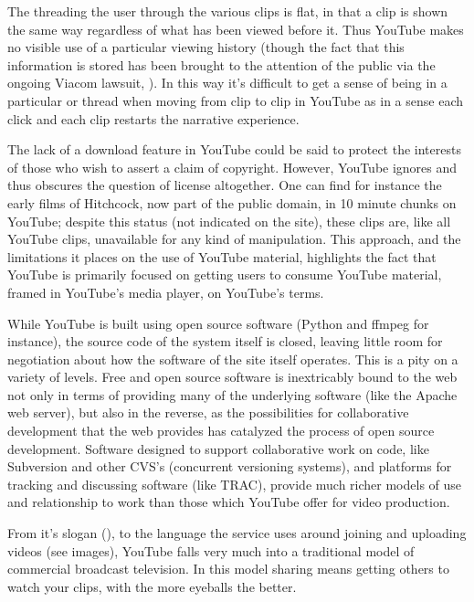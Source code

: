 {The  threading the user
through the various clips is flat, in that a clip is shown the same way
regardless of what has been viewed before it. Thus YouTube makes no
visible use of a particular viewing history (though the fact that this
information is stored has been brought to the attention of the public
via the ongoing Viacom lawsuit,
). In this way
it's difficult to get a sense of being in a particular
 or thread when moving
from clip to clip in YouTube as in a sense each click and each clip
restarts the narrative experience.


The lack of a download feature in YouTube could be said to protect the
interests of those who wish to assert a claim of copyright. However,
YouTube ignores and thus obscures the question of license altogether.
One can find for instance the early films of Hitchcock, now part of the
public domain, in 10 minute chunks on YouTube; despite this status (not
indicated on the site), these clips are, like all YouTube clips,
unavailable for any kind of manipulation. This approach, and the
limitations it places on the use of YouTube material, highlights the
fact that YouTube is primarily focused on getting users to consume
YouTube material, framed in YouTube's media player, on
YouTube's terms.


While YouTube is built using open source software (Python and ffmpeg for
instance), the source code of the system itself is closed, leaving
little room for negotiation about how the software of the site itself
operates. This is a pity on a variety of levels. Free and open source
software is inextricably bound to the web not only in terms of
providing many of the underlying software (like the Apache web server),
but also in the reverse, as the possibilities for collaborative
development that the web provides has catalyzed the process of open
source development. Software designed to support collaborative work on
code, like Subversion and other CVS's (concurrent
versioning systems), and platforms for tracking and discussing software
(like TRAC), provide much richer models of use and relationship to work
than those which YouTube offer for video production.

From it's slogan (), to the language the service uses around
joining and uploading videos (see images), YouTube falls very much into
a traditional model of commercial broadcast television. In this model
sharing means getting others to watch your clips, with the more
eyeballs the better.

}
